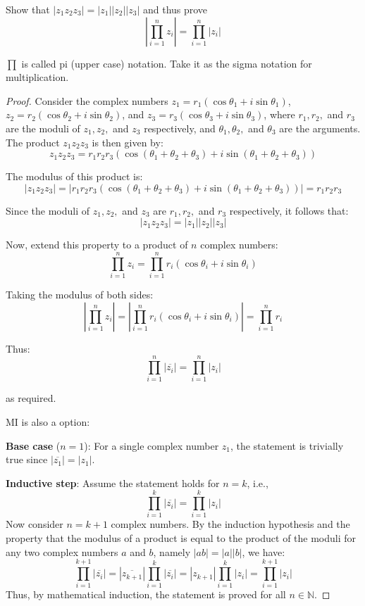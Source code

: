 \begin{exercise}
    Show that $|z_1z_2z_3|=|z_1||z_2||z_3|$ and thus prove 
    $$|\prod_{i=1}^{n} z_i| = \prod_{i=1}^{n} |z_i|$$
    \begin{remark}
        $\prod$ is called pi (upper case) notation. Take it as the sigma notation for multiplication.
    \end{remark}
\end{exercise}
    \begin{proof}
        Consider the complex numbers \( z_1 = r_1(\cos \theta_1 + i\sin \theta_1) \), \( z_2 = r_2(\cos \theta_2 + i\sin \theta_2) \), and \( z_3 = r_3(\cos \theta_3 + i\sin \theta_3) \), where \( r_1, r_2, \) and \( r_3 \) are the moduli of \( z_1, z_2, \) and \( z_3 \) respectively, and \( \theta_1, \theta_2, \) and \( \theta_3 \) are the arguments. The product \( z_1z_2z_3 \) is then given by:
        \[
        z_1z_2z_3 = r_1r_2r_3(\cos(\theta_1 + \theta_2 + \theta_3) + i\sin(\theta_1 + \theta_2 + \theta_3))
        \]
        
        The modulus of this product is:
        \[
        |z_1z_2z_3| = |r_1r_2r_3(\cos(\theta_1 + \theta_2 + \theta_3) + i\sin(\theta_1 + \theta_2 + \theta_3))| = r_1r_2r_3
        \]
        
        Since the moduli of \( z_1, z_2, \) and \( z_3 \) are \( r_1, r_2, \) and \( r_3 \) respectively, it follows that:
        \[
        |z_1z_2z_3| = |z_1||z_2||z_3|
        \]
        
        Now, extend this property to a product of \( n \) complex numbers:
        \[
        \prod_{i=1}^{n} z_i = \prod_{i=1}^{n} r_i(\cos \theta_i + i\sin \theta_i)
        \]
        
        Taking the modulus of both sides:
        \[
        \left|\prod_{i=1}^{n} z_i\right| = \left|\prod_{i=1}^{n} r_i(\cos \theta_i + i\sin \theta_i)\right| = \prod_{i=1}^{n} r_i
        \]
        
        Thus:
        \[
        \prod_{i=1}^{n} |\overline{z_i}| = \prod_{i=1}^{n} |z_i|
        \]
        
        as required.

        MI is also a option:

        \textbf{Base case} (\(n = 1\)): For a single complex number \(z_1\), the statement is trivially true since \(|\overline{z_1}| = |z_1|\).

        \textbf{Inductive step}: Assume the statement holds for \(n = k\), i.e.,
        \[
        \prod_{i=1}^{k} |\overline{z_i}| = \prod_{i=1}^{k} |z_i|
        \]
        Now consider \(n = k + 1\) complex numbers. By the induction hypothesis and the property that the modulus of a product is equal to the product of the moduli for any two complex numbers \(a\) and \(b\), namely \(|ab| = |a||b|\), we have:
        \[
        \prod_{i=1}^{k+1} |\overline{z_i}| = |\overline{z_{k+1}}| \prod_{i=1}^{k} |\overline{z_i}| = |z_{k+1}| \prod_{i=1}^{k} |z_i| = \prod_{i=1}^{k+1} |z_i|
        \]
        Thus, by mathematical induction, the statement is proved for all \(n \in \mathbb{N}\).
        \end{proof}

